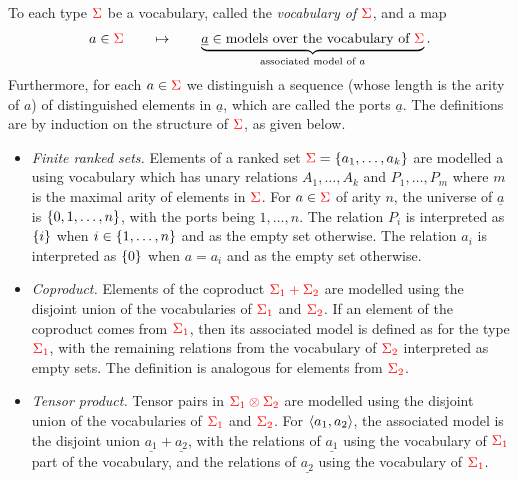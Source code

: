 \begin{definition} \label{def:type-model} To each type  ${\color{red}{\Sigma}}$ be a vocabulary, called the \emph{vocabulary of ${\color{red}{\Sigma}}$}, and a map 
    \begin{align*}
        a \in {\color{red}{\Sigma}} \qquad \mapsto \qquad \underbrace{\underline a \in \text{models over the  vocabulary of  ${\color{red}{\Sigma}}$}}_{\text{associated model of $a$}}.
    \end{align*}
    Furthermore, for each $a \in {\color{red}{\Sigma}}$ we  distinguish a  sequence (whose length is the arity of $a$) of distinguished elements in $\underline a$, which are called the ports $\underline a$.   The definitions are by induction on the structure of ${\color{red}{\Sigma}}$, as given below.
    \begin{itemize}
        \item \emph{Finite ranked sets.} Elements of a ranked set   ${\color{red}{\Sigma}} =  \{a_1,\ldots,a_k\}$ are modelled a using  vocabulary which has unary relations $A_1,\ldots,A_k$ and $P_1,\ldots,P_m$ where $m$ is the maximal arity of elements in ${\color{red}{\Sigma}}$. 
        For $a \in {\color{red}{\Sigma}}$ of arity $n$, the  universe of $\underline a$ is $\{0,1,\ldots,n\}$, with the ports being $1,\ldots,n$. 
            The  relation $P_i$  is interpreted as $\{i\}$ when $i \in \{1,\ldots,n\}$ and as the empty set otherwise. The relation $a_i$ is interpreted as $\{0\}$ when $a = a_i$ and as the empty set otherwise. 
        \item \emph{Coproduct.}  Elements of the coproduct ${\color{red}{\Sigma_1 + \Sigma_2}}$ are modelled using the disjoint union of the vocabularies of ${\color{red}{\Sigma_1}}$ and ${\color{red}{\Sigma_2}}$. 
            If an element of the coproduct comes from ${\color{red}{\Sigma_1}}$, then its associated model is defined as for the type ${\color{red}{\Sigma_1}}$, with  the remaining relations from the vocabulary of   ${\color{red}{ \Sigma_2}}$ interpreted   as empty sets. The definition is analogous for  elements from ${\color{red}{\Sigma_2}}$. 
        \item \emph{Tensor product.}   Tensor pairs in   ${\color{red}{\Sigma_1 \otimes \Sigma_2}}$ are modelled
        using the disjoint union of the vocabularies of ${\color{red}{\Sigma_1}}$ and ${\color{red}{\Sigma_2}}$. 
            For  $\langle{a_1,a_2}\rangle$, the associated model is    the disjoint union $\underline{a_1} + \underline {a_2}$, with the relations of $\underline {a_1}$ using the   vocabulary of  ${{\color{red}{\Sigma_1}}}$  part of the vocabulary, and the relations of $\underline {a_2}$ using the  vocabulary of    ${{\color{red}{\Sigma_1}}}$. 

\end{itemize}
\end{definition}

